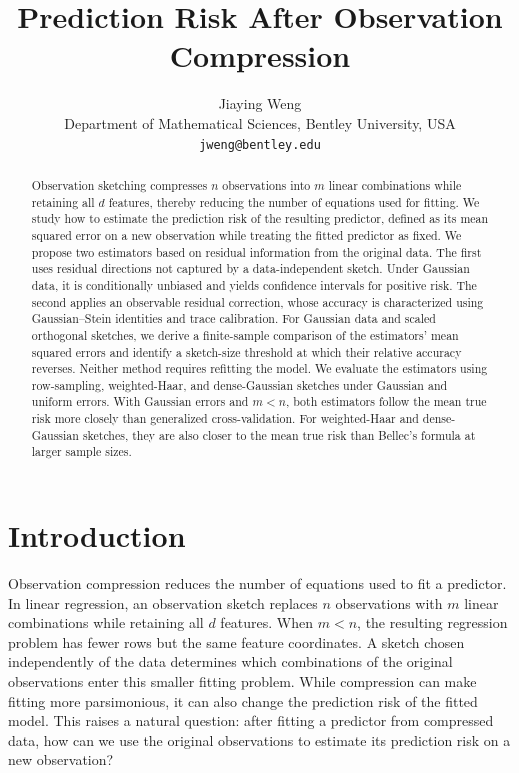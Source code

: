 \documentclass{article}
\title{Prediction Risk After Observation Compression}
\author{Jiaying Weng \\
Department of Mathematical Sciences, Bentley University, USA \\
\texttt{jweng@bentley.edu}}
\theoremstyle{plain}
\theoremstyle{definition}
\theoremstyle{definition}
\begin{document}
\maketitle

\begin{abstract}
Observation sketching compresses \(n\) observations into \(m\) linear combinations while retaining all \(d\) features, thereby reducing the number of equations used for fitting. We study how to estimate the prediction risk of the resulting predictor, defined as its mean squared error on a new observation while treating the fitted predictor as fixed. We propose two estimators based on residual information from the original data. The first uses residual directions not captured by a data-independent sketch. Under Gaussian data, it is conditionally unbiased and yields confidence intervals for positive risk. The second applies an observable residual correction, whose accuracy is characterized using Gaussian--Stein identities and trace calibration. For Gaussian data and scaled orthogonal sketches, we derive a finite-sample comparison of the estimators' mean squared errors and identify a sketch-size threshold at which their relative accuracy reverses. Neither method requires refitting the model. We evaluate the estimators using row-sampling, weighted-Haar, and dense-Gaussian sketches under Gaussian and uniform errors. With Gaussian errors and \(m<n\), both estimators follow the mean true risk more closely than generalized cross-validation. For weighted-Haar and dense-Gaussian sketches, they are also closer to the mean true risk than Bellec's formula at larger sample sizes.
\end{abstract}

\section{Introduction}
\label{sec:intro}

Observation compression reduces the number of equations used to fit a predictor. In linear regression, an observation sketch replaces $n$ observations with $m$ linear combinations while retaining all $d$ features. When $m<n$, the resulting regression problem has fewer rows but the same feature coordinates. A sketch chosen independently of the data determines which combinations of the original observations enter this smaller fitting problem. While compression can make fitting more parsimonious, it can also change the prediction risk of the fitted model. This raises a natural question: after fitting a predictor from compressed data, how can we use the original observations to estimate its prediction risk on a new observation?
\end{document}
